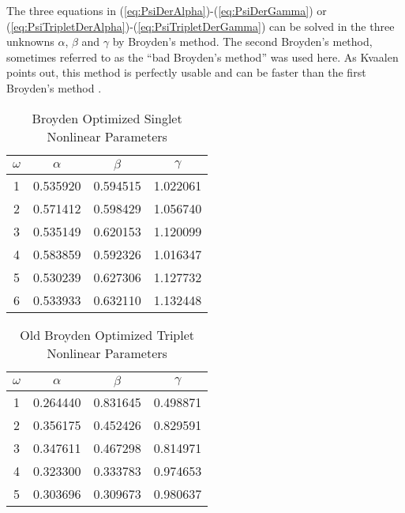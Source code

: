 \documentclass[Dissertation.tex]{subfiles}
\begin{document}
The three equations in (\ref{eq:PsiDerAlpha})-(\ref{eq:PsiDerGamma}) or (\ref{eq:PsiTripletDerAlpha})-(\ref{eq:PsiTripletDerGamma}) can be solved in the three unknowns $\alpha$, $\beta$ and $\gamma$ by Broyden's method.  The second Broyden's method, sometimes referred to as the ``bad Broyden's method'' was used here.  As Kvaalen points out, this method is perfectly usable and can be faster than the first Broyden's method \cite{Kvaalen1991}.


\setlength{\abovecaptionskip}{6pt}   %
\setlength{\belowcaptionskip}{6pt}   %
\begin{table}[ht]
\caption{Broyden Optimized Singlet Nonlinear Parameters}
\centering
\begin{tabular}{c c c c}
\hline\hline
$\omega$ & $\alpha$ & $\beta$ & $\gamma$ \\ [0.5ex]
\hline
1 & 0.535920 & 0.594515 & 1.022061 \\
2 & 0.571412 & 0.598429 & 1.056740 \\
3 & 0.535149 & 0.620153 & 1.120099 \\
4 & 0.583859 & 0.592326 & 1.016347 \\
5 & 0.530239 & 0.627306 & 1.127732 \\
6 & 0.533933 & 0.632110 & 1.132448 \\
\hline\hline
\end{tabular}
\label{table:NonlinearOptimized1SBroyden}
\end{table}


\setlength{\abovecaptionskip}{6pt}   %
\setlength{\belowcaptionskip}{6pt}   %
\begin{table}[ht]
\caption{Old Broyden Optimized Triplet Nonlinear Parameters}
\centering
\begin{tabular}{c c c c}
\hline\hline
$\omega$ & $\alpha$ & $\beta$ & $\gamma$ \\ [0.5ex]
\hline
1 & 0.264440 & 0.831645 & 0.498871 \\
2 & 0.356175 & 0.452426 & 0.829591 \\
3 & 0.347611 & 0.467298 & 0.814971 \\
4 & 0.323300 & 0.333783 & 0.974653 \\
5 & 0.303696 & 0.309673 & 0.980637 \\
\hline\hline
\end{tabular}
\label{table:NonlinearOptimized3SBroydenoLD}
\end{table}
\end{document}

